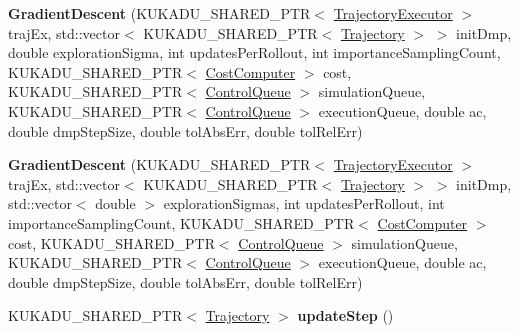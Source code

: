 \begin{DoxyCompactItemize}
\item 
{\bfseries Gradient\+Descent} (K\+U\+K\+A\+D\+U\+\_\+\+S\+H\+A\+R\+E\+D\+\_\+\+P\+TR$<$ \hyperlink{classkukadu_1_1TrajectoryExecutor}{Trajectory\+Executor} $>$ traj\+Ex, std\+::vector$<$ K\+U\+K\+A\+D\+U\+\_\+\+S\+H\+A\+R\+E\+D\+\_\+\+P\+TR$<$ \hyperlink{classkukadu_1_1Trajectory}{Trajectory} $>$ $>$ init\+Dmp, double exploration\+Sigma, int updates\+Per\+Rollout, int importance\+Sampling\+Count, K\+U\+K\+A\+D\+U\+\_\+\+S\+H\+A\+R\+E\+D\+\_\+\+P\+TR$<$ \hyperlink{classkukadu_1_1CostComputer}{Cost\+Computer} $>$ cost, K\+U\+K\+A\+D\+U\+\_\+\+S\+H\+A\+R\+E\+D\+\_\+\+P\+TR$<$ \hyperlink{classkukadu_1_1ControlQueue}{Control\+Queue} $>$ simulation\+Queue, K\+U\+K\+A\+D\+U\+\_\+\+S\+H\+A\+R\+E\+D\+\_\+\+P\+TR$<$ \hyperlink{classkukadu_1_1ControlQueue}{Control\+Queue} $>$ execution\+Queue, double ac, double dmp\+Step\+Size, double tol\+Abs\+Err, double tol\+Rel\+Err)\hypertarget{classkukadu_1_1GradientDescent_a8d139ea3df9ad0f8d3db34a4f8d96ff0}{}\label{classkukadu_1_1GradientDescent_a8d139ea3df9ad0f8d3db34a4f8d96ff0}

\item 
{\bfseries Gradient\+Descent} (K\+U\+K\+A\+D\+U\+\_\+\+S\+H\+A\+R\+E\+D\+\_\+\+P\+TR$<$ \hyperlink{classkukadu_1_1TrajectoryExecutor}{Trajectory\+Executor} $>$ traj\+Ex, std\+::vector$<$ K\+U\+K\+A\+D\+U\+\_\+\+S\+H\+A\+R\+E\+D\+\_\+\+P\+TR$<$ \hyperlink{classkukadu_1_1Trajectory}{Trajectory} $>$ $>$ init\+Dmp, std\+::vector$<$ double $>$ exploration\+Sigmas, int updates\+Per\+Rollout, int importance\+Sampling\+Count, K\+U\+K\+A\+D\+U\+\_\+\+S\+H\+A\+R\+E\+D\+\_\+\+P\+TR$<$ \hyperlink{classkukadu_1_1CostComputer}{Cost\+Computer} $>$ cost, K\+U\+K\+A\+D\+U\+\_\+\+S\+H\+A\+R\+E\+D\+\_\+\+P\+TR$<$ \hyperlink{classkukadu_1_1ControlQueue}{Control\+Queue} $>$ simulation\+Queue, K\+U\+K\+A\+D\+U\+\_\+\+S\+H\+A\+R\+E\+D\+\_\+\+P\+TR$<$ \hyperlink{classkukadu_1_1ControlQueue}{Control\+Queue} $>$ execution\+Queue, double ac, double dmp\+Step\+Size, double tol\+Abs\+Err, double tol\+Rel\+Err)\hypertarget{classkukadu_1_1GradientDescent_aff09fe5b91da1579522a19b859173d1e}{}\label{classkukadu_1_1GradientDescent_aff09fe5b91da1579522a19b859173d1e}

\item 
K\+U\+K\+A\+D\+U\+\_\+\+S\+H\+A\+R\+E\+D\+\_\+\+P\+TR$<$ \hyperlink{classkukadu_1_1Trajectory}{Trajectory} $>$ {\bfseries update\+Step} ()\hypertarget{classkukadu_1_1GradientDescent_aa7238397f55b06abb5255afd327c8402}{}\label{classkukadu_1_1GradientDescent_aa7238397f55b06abb5255afd327c8402}


\end{DoxyCompactItemize}
